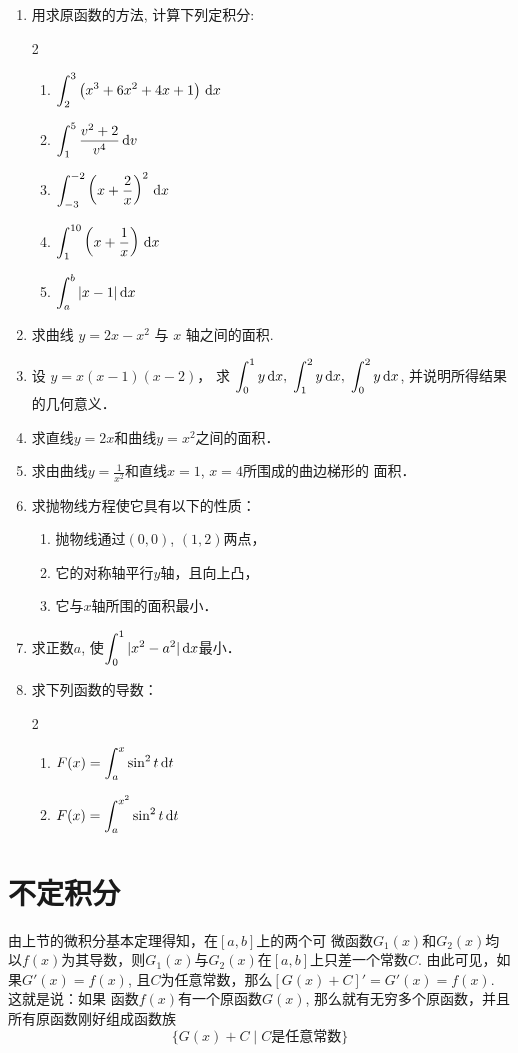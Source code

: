 \begin{ex}
\begin{enumerate}
\item 用求原函数的方法, 计算下列定积分:
\begin{multicols}{2}
\begin{enumerate}
 \item $\displaystyle\int_{2}^{3}\left(x^{3}+6 x^{2}+4 x+1\right) \,{\rm d} x$
\item $\displaystyle\int_{1}^{5} \dfrac{v^{2}+2}{v^{4}} \,{\rm d} v$
\item $\displaystyle\int_{-3}^{-2}\left(x+\dfrac{2}{x}\right)^{2} \,{\rm d} x$
\item $\displaystyle\int_{1}^{10}\left(x+\dfrac{1}{x}\right) \,{\rm d} x$
\item $\displaystyle\int_{a}^{b}|x-1| \,{\rm d} x$
\end{enumerate}
\end{multicols}
\item 求曲线 $y=2 x-x^{2}$ 与 $x$ 轴之间的面积.
\item 设 $y=x(x-1)(x-2)$，
求 $\displaystyle\int_{0}^{1} y \,{\rm d} x,\; \displaystyle\int_{1}^{2} y\,{\rm d} x,\; \displaystyle\int_{0}^{2} y \,{\rm d} x$,
并说明所得结果的几何意义．

\item 求直线$y=2x$和曲线$y=x^2$之间的面积．
\item 求由曲线$y=\frac{1}{x^2}$和直线$x=1$, $x=4$所围成的曲边梯形的
面积．
\item 求抛物线方程使它具有以下的性质：
\begin{enumerate}
\item 抛物线通过$(0, 0)$, $(1, 2)$两点，
\item 它的对称轴平行$y$轴，且向上凸，
\item 它与$x$轴所围的面积最小．
\end{enumerate}

\item 求正数$a$, 使$\displaystyle\int^1_0 |x^2-a^2|\,{\rm d} x$最小．
\item 求下列函数的导数：
\begin{multicols}{2}
    \begin{enumerate}
     \item $F(x)=\displaystyle\int_{a}^{x}\sin^2 t \,{\rm d} t$
    \item $F(x)=\displaystyle\int_{a}^{x^2} \sin^2 t \,{\rm d} t$
    \end{enumerate}
    \end{multicols}
\end{enumerate}

\end{ex}

\section{不定积分}
由上节的微积分基本定理得知，在$[a,b]$上的两个可
微函数$G_1(x)$和$G_2(x)$均以$f(x)$为其导数，则$G_1(x)$与$G_2(x)$在$[a,b]$上只差一个常数$C$. 由此可见，如果$G'(x)=f(x)$, 且$C$为任意常数，那么$[G(x)+C]'=G'(x)=f(x)$. 这就是说：如果 函数$f(x)$有一个原函数$G(x)$, 那么就有无穷多个原函数，并且所有原函数刚好组成函数族
\[\{G(x)+C\;|\; C\text{是任意常数}\}\]

